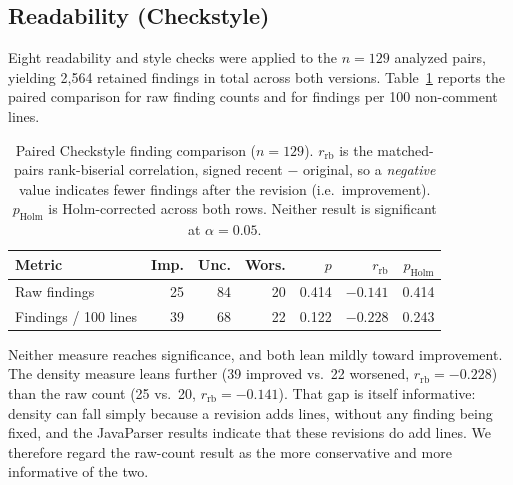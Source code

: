 \subsection{Readability (Checkstyle)}
\label{sec:or-checkstyle}

Eight readability and style checks were applied to the $n=129$ analyzed pairs, yielding 2{,}564 retained findings in total across both versions.
Table~\ref{tab:or-checkstyle} reports the paired comparison for raw finding counts and for findings per 100 non-comment lines.

\begin{table}[htbp]
\centering
\caption{Paired Checkstyle finding comparison ($n=129$).
$r_{\text{rb}}$ is the matched-pairs rank-biserial correlation, signed recent $-$ original, so a \emph{negative} value indicates fewer findings after the revision (i.e.\ improvement).
$p_{\text{Holm}}$ is Holm-corrected across both rows.
Neither result is significant at $\alpha=0.05$.}
\label{tab:or-checkstyle}
\small
\begin{tabular}{lrrrrrr}
\toprule
Metric & Imp. & Unc. & Wors. & $p$ & $r_{\text{rb}}$ & $p_{\text{Holm}}$ \\
\midrule
Raw findings         & 25 & 84 & 20 & 0.414 & $-0.141$ & 0.414 \\
Findings / 100 lines & 39 & 68 & 22 & 0.122 & $-0.228$ & 0.243 \\
\bottomrule
\end{tabular}
\end{table}

Neither measure reaches significance, and both lean mildly toward improvement.
The density measure leans further (39 improved vs.\ 22 worsened, $r_{\text{rb}}=-0.228$) than the raw count (25 vs.\ 20, $r_{\text{rb}}=-0.141$).
That gap is itself informative: density can fall simply because a revision adds lines, without any finding being fixed, and the JavaParser results indicate that these revisions do add lines.
We therefore regard the raw-count result as the more conservative and more informative of the two.


